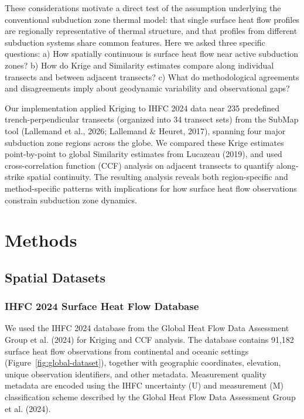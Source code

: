 \documentclass[draft,linenumbers]{agujournal2019}
\begin{document}
These considerations motivate a direct test of the assumption underlying
the conventional subduction zone thermal model: that single surface heat
flow profiles are regionally representative of thermal structure, and
that profiles from different subduction systems share common features.
Here we asked three specific questions: a) How spatially continuous is
surface heat flow near active subduction zones? b) How do Krige and
Similarity estimates compare along individual transects and between
adjacent transects? c) What do methodological agreements and
disagreements imply about geodynamic variability and observational gaps?

Our implementation applied Kriging to IHFC 2024 data near 235 predefined
trench-perpendicular transects (organized into 34 transect sets) from
the SubMap tool ({Lallemand et al.}, 2026; Lallemand \& Heuret, 2017),
spanning four major subduction zone regions across the globe. We
compared these Krige estimates point-by-point to global Similarity
estimates from Lucazeau (2019), and used cross-correlation function
(CCF) analysis on adjacent transects to quantify along-strike spatial
continuity. The resulting analysis reveals both region-specific and
method-specific patterns with implications for how surface heat flow
observations constrain subduction zone dynamics.

\section{Methods}\label{sec:methods}

\subsection{Spatial Datasets}\label{sec:datasets}

\subsubsection{IHFC 2024 Surface Heat Flow
Database}\label{sec:ihfc2024-database}

We used the IHFC 2024 database from the Global Heat Flow Data Assessment
Group et al. (2024) for Kriging and CCF analysis. The database contains
91,182 surface heat flow observations from continental and oceanic
settings (Figure~\ref{fig:global-dataset}), together with geographic
coordinates, elevation, unique observation identifiers, and other
metadata. Measurement quality metadata are encoded using the IHFC
uncertainty (U) and measurement (M) classification scheme described by
the Global Heat Flow Data Assessment Group et al. (2024).
\end{document}
